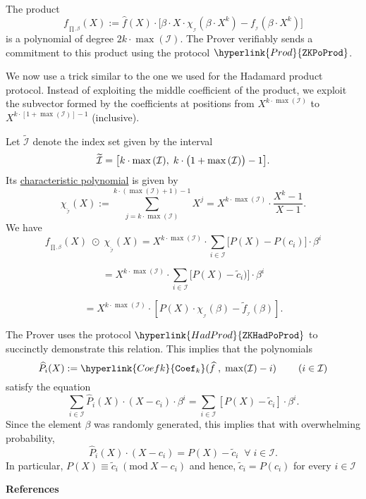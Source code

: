 \documentclass[11pt, lettersize, notitlepage, leqno, footskip=0.6cm]{article}
\newcommand{\wti}{\widetilde}
\newcommand{\mc}{\mathcal}
\newcommand{\be}{\beta}
\newcommand{\what}{\widehat}
\newcommand{\vs}{\vspace{-0.15cm}}
\newcommand{\noin}{\noindent}
\newcommand{\op}{overwhelming probability}
\newcommand{\Mod}[1]{\ (\mathrm{mod}\ #1)}
\numberwithin{equation}{section}
\begin{document}
The product  $$ f_{_{\prod,\be}}(X):= \what{f}(X) \cdot \big[\be\cdot X\cdot \chi_{_{\mc{I}}}(\be\cdot X^k) - f_{_{\mc{I}}}(\be\cdot X^k)\big] $$ is a polynomial of degree $2k\cdot \max{(\mc{I})}$. The Prover verifiably sends a commitment to this product using the protocol $\hyperlink{Prod}{\tt{ZKPoProd}}$. 

We now use a trick similar to the one we used for the Hadamard product protocol. Instead of exploiting the middle coefficient of the product, we exploit the subvector formed by the coefficients at positions from $X^{k\cdot \max(\mc{I})}$ to $X^{k\cdot [1+\max{(\mc{I})}]-1}$ (inclusive). 

Let $\wti{\mc{I}}$ denote the index set given by the interval \vs $$\wti{\mc{I}}= \big[k\cdot \max{(\mc{I})},\;k\cdot \big(1+\max{(\mc{I})}\big)-1 \big] .\vs $$ Its \hyperlink{charpoly}{characteristic polynomial} is given by \vs $$\chi_{_{\wti{\mc{I}}}}(X):= \sum\limits_{j = k\cdot \max(\mc{I})}^{k\cdot (\max(\mc{I})+1)-1} X^{j} = X^{k\cdot \max(\mc{I})}\cdot \frac{X^{k}-1}{X-1}.$$ We have \[ f_{_{\prod,\be}}(X)\;\odot\; \chi_{_{\wti{\mc{I}}}}(X) =  X^{k\cdot \max{(\mc{I})}}\cdot \sum\limits_{i\in \mc{I}} \big[P(X)-P(c_i)\big]\cdot \be^i \] 

\vspace{-3mm} \[ = X^{k\cdot \max{(\mc{I})}}\cdot \sum\limits_{i\in \mc{I}} \big[P(X)-\wti{c}_i)\big]\cdot \be^i\]

\vspace{-3mm} \[ = X^{k\cdot \max{(\mc{I})}} \cdot [P(X)\cdot \chi_{_{\mc{I}}}(\be)- \wti{f}_{_{\mc{I}}}(\be)].\]

\noin The Prover uses the protocol $\hyperlink{HadProd}{\tt{ZKHadPoProd}}$ to succinctly demonstrate this relation. This implies that the polynomials \vs $$ \what{P}_i(X):= \hyperlink{Coefk}{{\tt{Coef}}_k}(\what{f}\;,\;\max(\mc{I})- i)\;\;\;\;\;\;\;\;(i\in\mc{I}) \vs $$ satisfy the equation $$\sum\limits_{i\in\mc{I}} \what{P}_i(X)\cdot (X-c_i)\cdot \be^i = \sum\limits_{i\in \mc{I}} [P(X)-\wti{c}_i]\cdot \be^i. $$ Since the element $\be$ was randomly generated, this implies that with \op, \vs $$ \what{P}_i(X)\cdot (X-c_i)  = P(X)- \wti{c}_i\;\;\forall\;i\in \mc{I}.$$ In particular, $P(X)\equiv \wti{c}_i\Mod{X-c_i}$ and hence, $\wti{c}_i = P(c_i)$ for every $i\in \mc{I}$ 


\newpage 






\begin{center}\textbf{References}\end{center}
\end{document}

